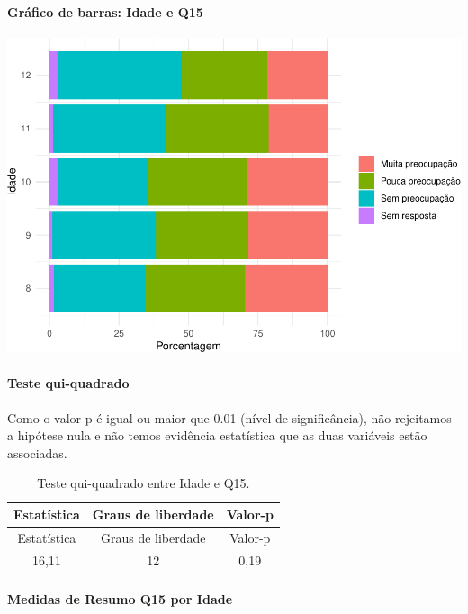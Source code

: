 \documentclass[]{article}
\let\oldparagraph\paragraph
\renewcommand{\paragraph}[1]{\oldparagraph{#1}\mbox{}}
\begin{document}
\hypertarget{gruxe1fico-de-barras-idade-e-q15}{%
\paragraph{Gráfico de barras: Idade e Q15}\label{gruxe1fico-de-barras-idade-e-q15}}

\begin{center}\includegraphics[width=0.75\linewidth]{relatorio_covid19_files/figure-latex/unnamed-chunk-93-1} \end{center}

\hypertarget{teste-qui-quadrado-9}{%
\paragraph{Teste qui-quadrado}\label{teste-qui-quadrado-9}}

Como o valor-p é igual ou maior que 0.01 (nível de significância), não rejeitamos a hipótese nula e não temos evidência estatística que as duas variáveis estão associadas.

\begin{longtable}[]{@{}ccc@{}}
\caption{\label{tab:unnamed-chunk-95}Teste qui-quadrado entre Idade e Q15.}\tabularnewline
\toprule
Estatística & Graus de liberdade & Valor-p\tabularnewline
\midrule
\endfirsthead
\toprule
Estatística & Graus de liberdade & Valor-p\tabularnewline
\midrule
\endhead
16,11 & 12 & 0,19\tabularnewline
\bottomrule
\end{longtable}

\cleardoublepage

\hypertarget{medidas-de-resumo-q15-por-idade}{%
\paragraph{Medidas de Resumo Q15 por Idade}\label{medidas-de-resumo-q15-por-idade}}
\end{document}
